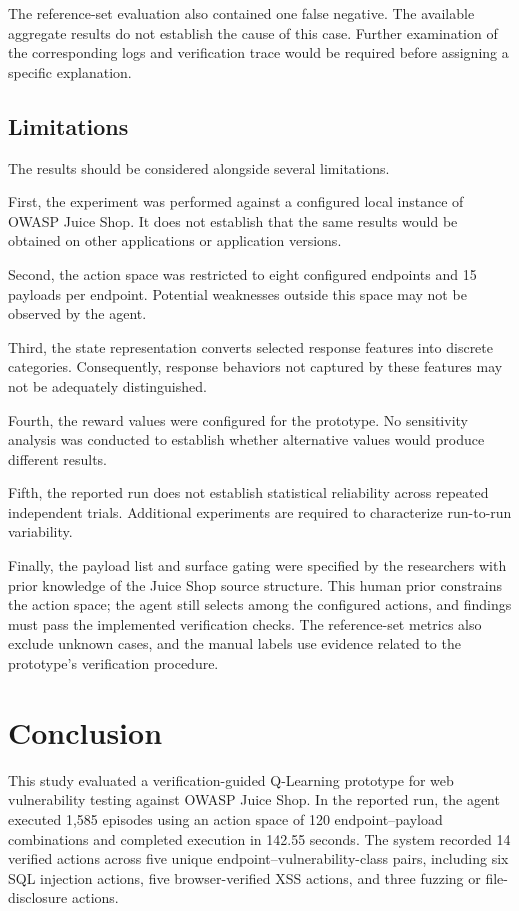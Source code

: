 \documentclass[conference]{IEEEtran}
\begin{document}
The reference-set evaluation also contained one false
negative. The available aggregate results do not establish
the cause of this case. Further examination of the
corresponding logs and verification trace would be
required before assigning a specific explanation.

\subsection{Limitations}

The results should be considered alongside several
limitations.

First, the experiment was performed against a configured
local instance of OWASP Juice Shop. It does not establish
that the same results would be obtained on other
applications or application versions.

Second, the action space was restricted to eight
configured endpoints and 15 payloads per endpoint.
Potential weaknesses outside this space may not be
observed by the agent.

Third, the state representation converts selected response
features into discrete categories. Consequently, response
behaviors not captured by these features may not be
adequately distinguished.

Fourth, the reward values were configured for the
prototype. No sensitivity analysis was conducted to
establish whether alternative values would produce
different results.

Fifth, the reported run does not establish statistical
reliability across repeated independent trials.
Additional experiments are required to characterize
run-to-run variability.

Finally, the payload list and surface gating were specified
by the researchers with prior knowledge of the Juice Shop
source structure. This human prior constrains the action
space; the agent still selects among the configured actions,
and findings must pass the implemented verification checks.
The reference-set metrics also exclude unknown cases, and
the manual labels use evidence related to the prototype's
verification procedure.

\section{Conclusion}

This study evaluated a verification-guided Q-Learning
prototype for web vulnerability testing against OWASP
Juice Shop. In the reported run, the agent executed
1,585 episodes using an action space of 120
endpoint--payload combinations and completed execution
in 142.55 seconds. The system recorded 14 verified
actions across five unique endpoint--vulnerability-class pairs,
including six SQL injection actions, five browser-verified
XSS actions, and three fuzzing or file-disclosure actions.
\end{document}
